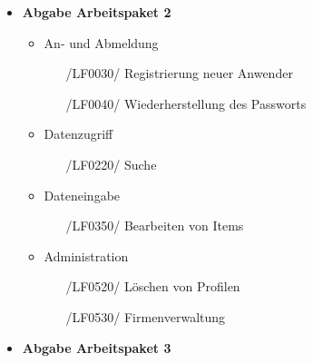 \documentclass[11pt,a4paper]{report}
\begin{document}
\begin{itemize}
\item
  \textbf{Abgabe Arbeitspaket 2}
  
  \begin{itemize}
  	\item
  		An- und Abmeldung
  		\begin{itemize}
  		\leftskip=3em
  		\item[/LF0030/] Registrierung neuer Anwender
  		\item[/LF0040/] Wiederherstellung des Passworts
  		\end{itemize}
	\item
    	Datenzugriff
    	\begin{itemize}
    	\leftskip=3em
    	\item[/LF0220/] Suche
    	\end{itemize}
	\item
    	Dateneingabe
    	\begin{itemize}
    	\leftskip=3em
    	\item[/LF0350/] Bearbeiten von Items
    	\end{itemize}
	\item
    	Administration
    	\begin{itemize}
    	\leftskip=3em
    	\item[/LF0520/] Löschen von Profilen
    	\item[/LF0530/] Firmenverwaltung
    	\end{itemize}
  \end{itemize}
\newpage
\item
  \textbf{Abgabe Arbeitspaket 3}
  

\end{itemize}
\end{document}
